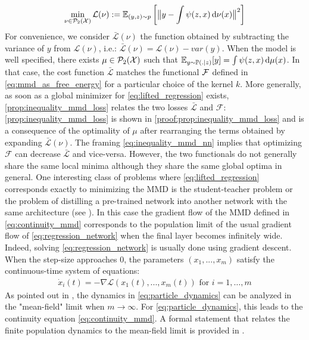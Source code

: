 \begin{align}\label{eq:lifted_regression}
	\min_{\nu \in \mathcal{P}_2({{\mathcal X}})}  \mathcal{L}(\nu) :=  \mathbb{E}_{(y,z)\sim p} \left [ \big\Vert y - \int \psi(z,x) \mathop{}\!\mathrm{d} \nu(x) \big\Vert^2 \right ]
\end{align} 
For convenience, we consider $\bar{\mathcal{L}}(\nu)$ the function obtained by subtracting the variance of $y$ from $\mathcal{L}(\nu)$, i.e.: $\bar{\mathcal{L}}(\nu) = \mathcal{L}(\nu) - var(y) $. When the model is well specified, there exists $\mu \in \mathcal{P}_2({{\mathcal X}}) $ such that $\mathbb{E}_{y\sim \mathbb{P}(.|z)}[y] =  \int \psi(z,x) \mathop{}\!\mathrm{d} \mu(x)$. In that case, the cost function $\bar{\mathcal{L}}$ matches  the functional ${{\mathcal F}}$ defined in \cref{eq:mmd_as_free_energy}  for a particular choice of the kernel $k$. More generally, as soon as a global minimizer for  \cref{eq:lifted_regression} exists,  \cref{prop:inequality_mmd_loss} relates the two losses $\bar{\mathcal{L}}$ and $\mathcal{F}$:
\cref{prop:inequality_mmd_loss} is shown in \cref{proof:prop:inequality_mmd_loss} and is a consequence of the optimality of $\mu$ after rearranging the terms obtained by expanding $\bar{\mathcal{L}}(\nu)$.
The framing \cref{eq:inequality_mmd_nn} implies that optimizing $\mathcal{F}$ can decrease  $\bar{\mathcal{L}}$ and vice-versa. However, the two functionals do not generally share the same local minima although they share the same global optima in general. One interesting class of problems where \cref{eq:lifted_regression} corresponds exactly to minimizing the MMD is the student-teacher problem or the problem of distilling a pre-trained network into another network with the same architecture (see \cite{rotskoff2019global}). In this case the gradient flow of the MMD defined in \cref{eq:continuity_mmd} corresponds to the population limit of the usual gradient flow of \cref{eq:regression_network} when the final layer becomes infinitely wide. Indeed, solving \cref{eq:regression_network} is usually done using gradient descent. When the step-size approaches $0$, the parameters $(x_1,...,x_m)$ satisfy the continuous-time system of equations:
\begin{align}\label{eq:particle_dynamics}
	\dot{x}_i(t)= -\nabla \mathcal{L}(x_1(t),...,x_m(t)) \text{ for } i=1, \dots, m
\end{align}  
As pointed out in \cite{chizat2018global,rotskoff2018neural}, the dynamics in \cref{eq:particle_dynamics} can be analyzed in the "mean-field" limit when $m\rightarrow \infty$. For \cref{eq:particle_dynamics}, this leads to the continuity equation \cref{eq:continuity_mmd}. A formal statement that relates the finite population dynamics to the mean-field limit is provided in . 
